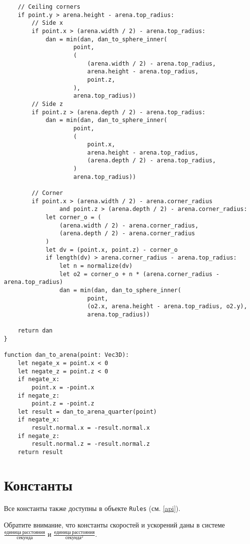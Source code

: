 \begin{verbatim}
    // Ceiling corners
    if point.y > arena.height - arena.top_radius:
        // Side x
        if point.x > (arena.width / 2) - arena.top_radius:
            dan = min(dan, dan_to_sphere_inner(
                    point,
                    (
                        (arena.width / 2) - arena.top_radius,
                        arena.height - arena.top_radius,
                        point.z,
                    ),
                    arena.top_radius))
        // Side z
        if point.z > (arena.depth / 2) - arena.top_radius:
            dan = min(dan, dan_to_sphere_inner(
                    point,
                    (
                        point.x,
                        arena.height - arena.top_radius,
                        (arena.depth / 2) - arena.top_radius,
                    )
                    arena.top_radius))

        // Corner
        if point.x > (arena.width / 2) - arena.corner_radius
                and point.z > (arena.depth / 2) - arena.corner_radius:
            let corner_o = (
                (arena.width / 2) - arena.corner_radius,
                (arena.depth / 2) - arena.corner_radius
            )
            let dv = (point.x, point.z) - corner_o
            if length(dv) > arena.corner_radius - arena.top_radius:
                let n = normalize(dv)
                let o2 = corner_o + n * (arena.corner_radius - arena.top_radius)
                dan = min(dan, dan_to_sphere_inner(
                        point,
                        (o2.x, arena.height - arena.top_radius, o2.y),
                        arena.top_radius))
    
    return dan    
}

function dan_to_arena(point: Vec3D):
    let negate_x = point.x < 0
    let negate_z = point.z < 0
    if negate_x:
        point.x = -point.x
    if negate_z:
        point.z = -point.z
    let result = dan_to_arena_quarter(point)
    if negate_x:
        result.normal.x = -result.normal.x
    if negate_z:
        result.normal.z = -result.normal.z
    return result
\end{verbatim}

\section{Константы}\label{constants}

Все константы также доступны в объекте \texttt{Rules} (см. \ref{api}).

Обратите внимание, что константы скоростей и ускорений даны в системе
$\frac{единица\ расстояния}{секунда}$ и $\frac{единица\ расстояния}{секунда^2}$.

